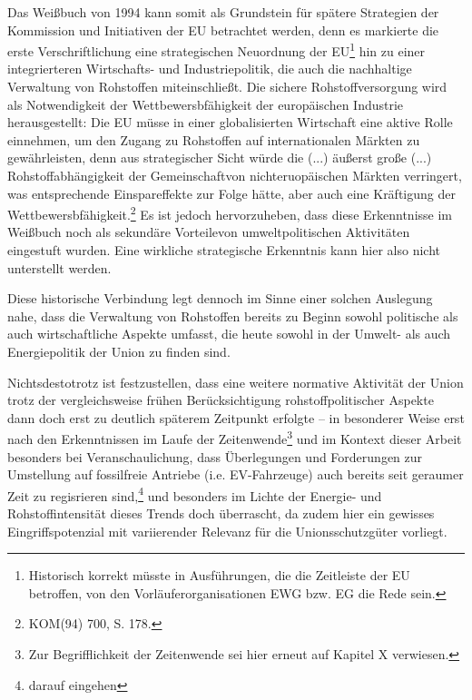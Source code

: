 \documentclass[12pt,a4paper,oneside]{book} %
\begin{document}
	
	Das Weißbuch von 1994 kann somit als Grundstein für spätere Strategien der Kommission und Initiativen der EU betrachtet werden, denn es markierte die erste Verschriftlichung eine strategischen Neuordnung der EU\footnote{Historisch korrekt müsste in Ausführungen, die die Zeitleiste der EU betroffen, von den Vorläuferorganisationen EWG bzw. EG die Rede sein.} hin zu einer integrierteren Wirtschafts- und Industriepolitik, die auch die nachhaltige Verwaltung von Rohstoffen miteinschließt. Die sichere Rohstoffversorgung wird als Notwendigkeit der Wettbewersbfähigkeit der europäischen Industrie herausgestellt: Die EU müsse in einer globalisierten Wirtschaft eine aktive Rolle einnehmen, um den Zugang zu  Rohstoffen auf internationalen Märkten zu gewährleisten, denn aus strategischer Sicht würde die \glqq (...) äußerst große (...) Rohstoffabhängigkeit der Gemeinschaft\grqq von nichteruopäischen Märkten verringert, was entsprechende Einspareffekte zur Folge hätte, aber auch eine Kräftigung der Wettbewersbfähigkeit.\footnote{KOM(94) 700, S. 178.} Es ist jedoch hervorzuheben, dass diese Erkenntnisse im Weißbuch noch als \glqq sekundäre Vorteile\grqq von umweltpolitischen Aktivitäten eingestuft wurden. Eine wirkliche strategische Erkenntnis kann hier also nicht unterstellt werden.
	
	Diese historische Verbindung legt dennoch im Sinne einer solchen Auslegung nahe, dass die Verwaltung von Rohstoffen bereits zu Beginn sowohl politische als auch wirtschaftliche Aspekte umfasst, die heute sowohl in der Umwelt- als auch Energiepolitik der Union zu finden sind.
	
	Nichtsdestotrotz ist festzustellen, dass eine weitere normative Aktivität der Union trotz der vergleichsweise frühen Berücksichtigung rohstoffpolitischer Aspekte dann doch erst zu deutlich späterem Zeitpunkt erfolgte -- in besonderer Weise erst nach den Erkenntnissen im Laufe der Zeitenwende\footnote{Zur Begrifflichkeit der Zeitenwende sei hier erneut auf Kapitel X verwiesen.} und im Kontext dieser Arbeit besonders bei Veranschaulichung, dass Überlegungen und Forderungen zur Umstellung auf fossilfreie Antriebe (i.e. EV-Fahrzeuge) auch bereits seit geraumer Zeit zu regisrieren sind,\footnote{darauf eingehen} und besonders im Lichte der Energie- und Rohstoffintensität dieses Trends doch überrascht, da zudem hier ein gewisses Eingriffspotenzial mit variierender Relevanz für die Unionsschutzgüter vorliegt. 
	
\end{document}
